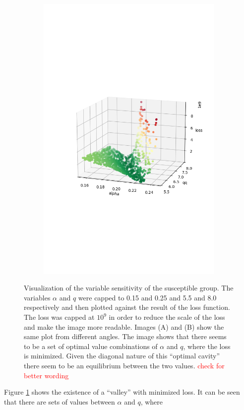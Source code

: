 \begin{figure}
\begin{subfigure}[b]{0.4\textwidth}
	\end{subfigure}
	\begin{subfigure}[b]{0.4\textwidth}
		\centering
		\includegraphics[width=\textwidth]{./figures/sensitivity/sensitivity_zoom1_0.png}	
	\end{subfigure}
	\caption{Visualization of the variable sensitivity of the susceptible group. The variables $\alpha$ and $q$ were
		capped to 0.15 and 0.25 and 5.5 and 8.0 respectively and then plotted against the result of the loss function.
		The loss was capped at $10^{9}$ in order to reduce the scale of the loss and make the image more readable.
		Images (A) and (B) show the same plot from different angles. The image shows that there seems to be a set of
		optimal value combinations of $\alpha$ and $q$, where the loss is minimized. Given the diagonal nature of this
		``optimal cavity'' there seem to be an equilibrium between the two values.
		\textcolor{red}{check for better wording} %
		}
	\label{fig:sensitivity_zoom1}
\end{figure}

Figure \ref*{fig:sensitivity_zoom1} shows the existence of a ``valley'' with minimized loss. It can be seen that there are 
sets of values between $\alpha$ and $q$, where 

